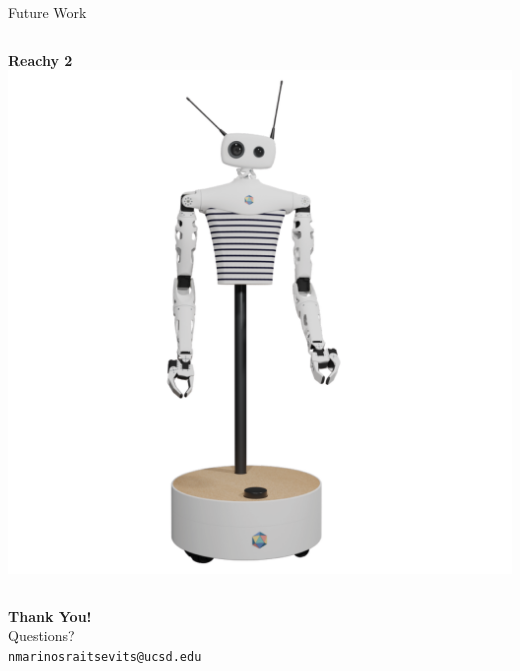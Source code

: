 \documentclass[10pt, aspectratio=169]{beamer}
\begin{document}
\begin{frame}{Future Work}
\begin{columns}
    \begin{column}{0.3\textwidth}
      \centering
      {\bfseries Reachy 2}\\[0.4em]
      \includegraphics[width=\linewidth]{Figures/reachy_02.png}
    \end{column}
\end{columns}
\end{frame}

\begin{frame}[plain] 
  \centering
  \vfill
  {\Huge \textbf{Thank You!}} \\[1.5em]
  {\Large Questions?} \\[3em]

  {\small
    \texttt{nmarinosraitsevits@ucsd.edu} \\
  }
  \vfill
\end{frame}
\end{document}

